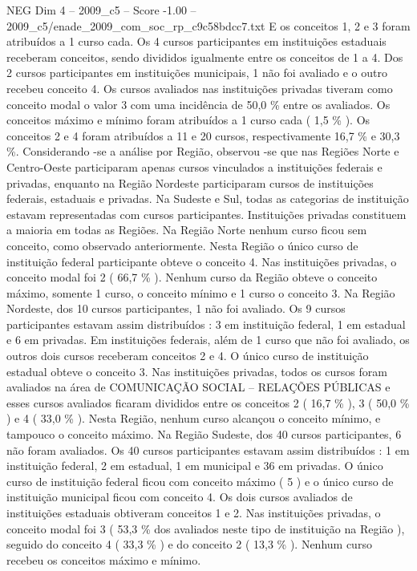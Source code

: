 \begin{textsample}{NEG Dim 4 – 2009\_c5 – Score -1.00 – 2009\_c5/enade\_2009\_com\_soc\_rp\_c9c58bdcc7.txt}
E os conceitos 1, 2 e 3 foram atribuídos a 1 curso cada.
Os 4 cursos participantes em instituições estaduais receberam conceitos, sendo divididos igualmente entre os conceitos de 1 a 4.
Dos 2 cursos participantes em instituições municipais, 1 não foi avaliado e o outro recebeu conceito 4.
Os cursos avaliados nas instituições privadas tiveram como conceito modal o valor 3 com uma incidência de 50,0 \% entre os avaliados.
Os conceitos máximo e mínimo foram atribuídos a 1 curso cada ( 1,5 \% ).
Os conceitos 2 e 4 foram atribuídos a 11 e 20 cursos, respectivamente 16,7 \% e 30,3 \%.
Considerando -se a análise por Região, observou -se que nas Regiões Norte e Centro-Oeste participaram apenas cursos vinculados a instituições federais e privadas, enquanto na Região Nordeste participaram cursos de instituições federais, estaduais e privadas.
Na Sudeste e Sul, todas as categorias de instituição estavam representadas com cursos participantes.
Instituições privadas constituem a maioria em todas as Regiões.
Na Região Norte nenhum curso ficou sem conceito, como observado anteriormente.
Nesta Região o único curso de instituição federal participante obteve o conceito 4.
Nas instituições privadas, o conceito modal foi 2 ( 66,7 \% ).
Nenhum curso da Região obteve o conceito máximo, somente 1 curso, o conceito mínimo e 1 curso o conceito 3.
Na Região Nordeste, dos 10 cursos participantes, 1 não foi avaliado.
Os 9 cursos participantes estavam assim distribuídos : 3 em instituição federal, 1 em estadual e 6 em privadas.
Em instituições federais, além de 1 curso que não foi avaliado, os outros dois cursos receberam conceitos 2 e 4.
O único curso de instituição estadual obteve o conceito 3.
Nas instituições privadas, todos os cursos foram avaliados na área de COMUNICAÇÃO SOCIAL – RELAÇÕES PÚBLICAS e esses cursos avaliados ficaram divididos entre os conceitos 2 ( 16,7 \% ), 3 ( 50,0 \% ) e 4 ( 33,0 \% ).
Nesta Região, nenhum curso alcançou o conceito mínimo, e tampouco o conceito máximo.
Na Região Sudeste, dos 40 cursos participantes, 6 não foram avaliados.
Os 40 cursos participantes estavam assim distribuídos : 1 em instituição federal, 2 em estadual, 1 em municipal e 36 em privadas.
O único curso de instituição federal ficou com conceito máximo ( 5 ) e o único curso de instituição municipal ficou com conceito 4.
Os dois cursos avaliados de instituições estaduais obtiveram conceitos 1 e 2.
Nas instituições privadas, o conceito modal foi 3 ( 53,3 \% dos avaliados neste tipo de instituição na Região ), seguido do conceito 4 ( 33,3 \% ) e do conceito 2 ( 13,3 \% ).
Nenhum curso recebeu os conceitos máximo e mínimo.

\end{textsample}
